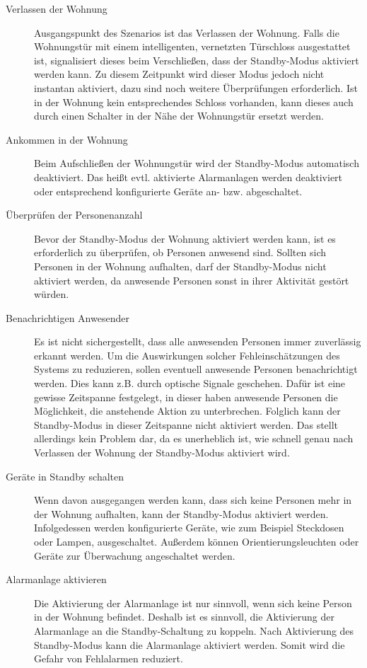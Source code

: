 \begin{description}
	\item [Verlassen der Wohnung] Ausgangspunkt des Szenarios ist das Verlassen der Wohnung. Falls die Wohnungstür mit einem intelligenten, vernetzten Türschloss ausgestattet ist, signalisiert dieses beim Verschließen, dass der Standby-Modus aktiviert werden kann. Zu diesem Zeitpunkt wird dieser Modus jedoch nicht instantan aktiviert, dazu sind noch weitere Überprüfungen erforderlich. Ist in der Wohnung kein entsprechendes Schloss vorhanden, kann dieses auch durch einen Schalter in der Nähe der Wohnungstür ersetzt werden.
	\item [Ankommen in der Wohnung] Beim Aufschließen der Wohnungstür wird der Standby-Modus automatisch deaktiviert. Das heißt evtl. aktivierte Alarmanlagen werden deaktiviert oder entsprechend konfigurierte Geräte an- bzw. abgeschaltet.
	\item [Überprüfen der Personenanzahl] Bevor der Standby-Modus der Wohnung aktiviert werden kann, ist es erforderlich zu überprüfen, ob Personen anwesend sind. Sollten sich Personen in der Wohnung aufhalten, darf der Standby-Modus nicht aktiviert werden, da anwesende Personen sonst in ihrer Aktivität gestört würden.
	\item [Benachrichtigen Anwesender] Es ist nicht sichergestellt, dass alle anwesenden Personen immer zuverlässig erkannt werden. Um die Auswirkungen solcher Fehleinschätzungen des Systems zu reduzieren, sollen eventuell anwesende Personen benachrichtigt werden. Dies kann z.B. durch optische Signale geschehen. Dafür ist eine gewisse Zeitspanne festgelegt, in dieser haben anwesende Personen die Möglichkeit, die anstehende Aktion zu unterbrechen. Folglich kann der Standby-Modus in dieser Zeitspanne nicht aktiviert werden. Das stellt allerdings kein Problem dar, da es unerheblich ist, wie schnell genau nach Verlassen der Wohnung der Standby-Modus aktiviert wird.
	\item [Geräte in Standby schalten] Wenn davon ausgegangen werden kann, dass sich keine Personen mehr in der Wohnung aufhalten, kann der Standby-Modus aktiviert werden. Infolgedessen werden konfigurierte Geräte, wie zum Beispiel Steckdosen oder Lampen, ausgeschaltet. Außerdem können Orientierungsleuchten oder Geräte zur Überwachung angeschaltet werden.
	\item[	Alarmanlage aktivieren] Die Aktivierung der Alarmanlage ist nur sinnvoll, wenn sich keine Person in der Wohnung befindet. Deshalb ist es sinnvoll, die Aktivierung der Alarmanlage an die Standby-Schaltung zu koppeln. Nach Aktivierung des Standby-Modus kann die Alarmanlage aktiviert werden. Somit wird die Gefahr von Fehlalarmen reduziert.
\end{description}

